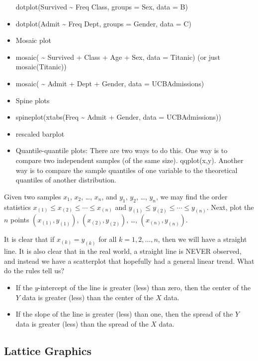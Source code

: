 \documentclass[]{book}
\providecommand{\tightlist}{%
  \setlength{\itemsep}{0pt}\setlength{\parskip}{0pt}}
\numberwithin{equation}{chapter}
\numberwithin{figure}{chapter}
\theoremstyle{plain}
\theoremstyle{definition}
\theoremstyle{remark}
\theoremstyle{definition}
\theoremstyle{definition}
\theoremstyle{remark}
\begin{document}
\begin{itemize}
  dotplot(Survived \textasciitilde{} Freq \textbar{} Class, groups =
  Sex, data = B)
\item
  dotplot(Admit \textasciitilde{} Freq \textbar{} Dept, groups = Gender,
  data = C)
\item
  Mosaic plot
\item
  mosaic( \textasciitilde{} Survived + Class + Age + Sex, data =
  Titanic) (or just mosaic(Titanic))
\item
  mosaic( \textasciitilde{} Admit + Dept + Gender, data = UCBAdmissions)
\item
  Spine plots
\item
  spineplot(xtabs(Freq \textasciitilde{} Admit + Gender, data =
  UCBAdmissions))
\item
  rescaled barplot
\item
  Quantile-quantile plots: There are two ways to do this. One way is to
  compare two independent samples (of the same size). qqplot(x,y).
  Another way is to compare the sample quantiles of one variable to the
  theoretical quantiles of another distribution.
\end{itemize}

Given two samples \(x_{1}\), \(x_{2}\), \ldots{}, \(x_{n}\), and
\(y_{1}\), \(y_{2}\), \ldots{}, \(y_{n}\), we may find the order
statistics \(x_{(1)}\leq x_{(2)}\leq\cdots\leq x_{(n)}\) and
\(y_{(1)}\leq y_{(2)}\leq\cdots\leq y_{(n)}\). Next, plot the \(n\)
points \((x_{(1)},y_{(1)})\), \((x_{(2)},y_{(2)})\), \ldots{},
\((x_{(n)},y_{(n)})\).

It is clear that if \(x_{(k)}=y_{(k)}\) for all \(k=1,2,\ldots,n\), then
we will have a straight line. It is also clear that in the real world, a
straight line is NEVER observed, and instead we have a scatterplot that
hopefully had a general linear trend. What do the rules tell us?

\begin{itemize}
\tightlist
\item
  If the \(y\)-intercept of the line is greater (less) than zero, then
  the center of the \(Y\) data is greater (less) than the center of the
  \(X\) data.
\item
  If the slope of the line is greater (less) than one, then the spread
  of the \(Y\) data is greater (less) than the spread of the \(X\) data.
\end{itemize}

\subsection{Lattice Graphics}\label{sub-lattice-graphics}
\end{document}
